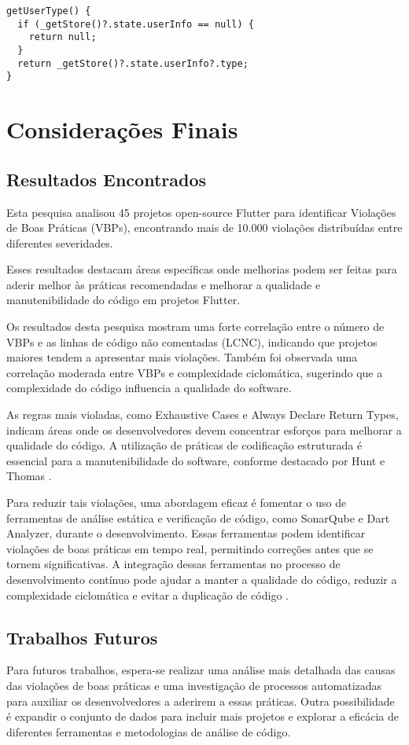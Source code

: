 \documentclass[12pt]{article}
\begin{document}
\begin{tcolorbox}[codeSnippetStyle={gsy\_github\_app\_flutter/lib/page/my\_page.dart}]
\begin{verbatim}
getUserType() {
  if (_getStore()?.state.userInfo == null) {
    return null;
  }
  return _getStore()?.state.userInfo?.type;
}
\end{verbatim}
\end{tcolorbox}

\section{Considerações Finais}
\subsection{Resultados Encontrados}
Esta pesquisa analisou 45 projetos open-source Flutter para identificar Violações de Boas Práticas (VBPs), encontrando mais de 10.000 violações distribuídas entre diferentes severidades.

Esses resultados destacam áreas específicas onde melhorias podem ser feitas para aderir melhor às práticas recomendadas e melhorar a qualidade e manutenibilidade do código em projetos Flutter.

Os resultados desta pesquisa mostram uma forte correlação entre o número de VBPs e as linhas de código não comentadas (LCNC), indicando que projetos maiores tendem a apresentar mais violações. Também foi observada uma correlação moderada entre VBPs e complexidade ciclomática, sugerindo que a complexidade do código influencia a qualidade do software.

As regras mais violadas, como Exhaustive Cases e Always Declare Return Types, indicam áreas onde os desenvolvedores devem concentrar esforços para melhorar a qualidade do código. A utilização de práticas de codificação estruturada é essencial para a manutenibilidade do software, conforme destacado por Hunt e Thomas \cite{hunt1999pragmatic}.

Para reduzir tais violações, uma abordagem eficaz é fomentar o uso de ferramentas de análise estática e verificação de código, como SonarQube e Dart Analyzer, durante o desenvolvimento.  Essas ferramentas podem identificar violações de boas práticas em tempo real, permitindo correções antes que se tornem significativas. A integração dessas ferramentas no processo de desenvolvimento contínuo pode ajudar a manter a qualidade do código, reduzir a complexidade ciclomática e evitar a duplicação de código \cite{measuringCC2023}.

\subsection{Trabalhos Futuros}
Para futuros trabalhos, espera-se realizar uma análise mais detalhada das causas das violações de boas práticas e uma investigação de processos automatizadas para auxiliar os desenvolvedores a aderirem a essas práticas. Outra possibilidade é expandir o conjunto de dados para incluir mais projetos e explorar a eficácia de diferentes ferramentas e metodologias de análise de código.



\end{document}
